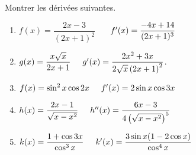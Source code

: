
\everymath{\displaystyle}


  \summary{}

\begin{exercice}
 Montrer les dérivées suivantes. 
 \begin{enumerate}
 \item 
  $  f(x)=\dfrac{2x-3}{(2x+1)^2} $
   $\hspace*{0.5cm} f^{\prime}(x)=\dfrac{-4x+14}{(2x+1)^3} $
 \item $ g(x)=\dfrac{x\sqrt{x}}{2x+1} \hspace*{0.5cm} g^{\prime}(x)=\dfrac{2x^2+3x}{2\sqrt{x}\left(2x+1\right)^2} $.
 \item $ f(x)=\sin^ 2 x \cos 2x \hspace*{0.5cm} f^{\prime}(x)= 2 \sin x \cos 3x $
  \item $ h(x)=\dfrac{2x-1}{\sqrt{x-x^2}} \hspace*{0.5cm} h^{\prime\prime}(x)=\dfrac{6x-3}{4\left(\sqrt{x-x^2}\right)^5} $
   \item $ k(x)=\dfrac{1+\cos 3x}{\cos^3 x} \hspace*{0.5cm}  k^{\prime}(x)=\dfrac{3\sin x(1-2\cos x)}{\cos^4 x} $
 \end{enumerate}
\end{exercice}

